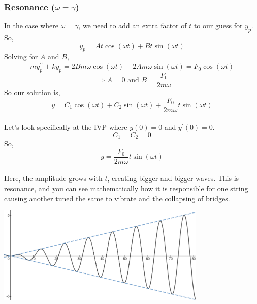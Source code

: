 \subsubsection{Resonance ($\omega = \gamma$)}
\noindent
In the case where $\omega = \gamma$, we need to add an extra factor of $t$ to our guess for $y_p$. So,
\begin{equation*}
	y_p = At\cos{(\omega t)} + Bt\sin{(\omega t)}
\end{equation*}
Solving for $A$ and $B$,
\begin{equation*}
	my_p^{\prime\prime} + ky_p = 2Bm\omega\cos{(\omega t)} - 2Am\omega\sin{(\omega t)} = F_0\cos{(\omega t)}
\end{equation*}
\begin{equation*}
	\implies A = 0 \text{ and } B = \frac{F_0}{2m\omega}
\end{equation*}
So our solution is,
\begin{equation*}
	y = C_1\cos{(\omega t)} + C_2\sin{(\omega t)} + \frac{F_0}{2m\omega}t\sin{(\omega t)}
\end{equation*}\\

\noindent
Let's look specifically at the IVP where $y(0) = 0$ and $y^\prime(0) = 0$.
\begin{equation*}
	C_1 = C_2 = 0
\end{equation*}
So,
\begin{equation*}
	y = \frac{F_0}{2m\omega}t\sin{(\omega t)}
\end{equation*}\\

\noindent
Here, the amplitude grows with $t$, creating bigger and bigger waves. This is resonance, and you can see mathematically how it is responsible for one string causing another tuned the same to vibrate and the collapsing of bridges.

\begin{center}
	\includegraphics[width=0.75\textwidth]{./higherOrder/forcedVibrs/resonance.png}
\end{center}